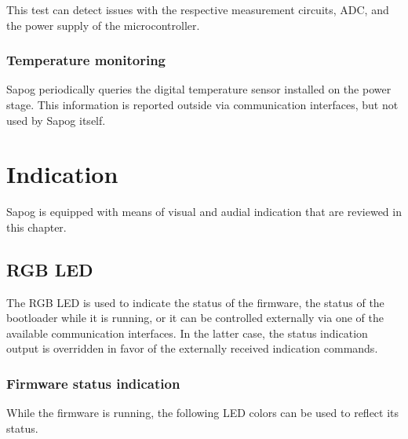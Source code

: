 \documentclass{zubaxdoc}
\begin{document}
This test can detect issues with the respective measurement circuits,
ADC, and the power supply of the microcontroller.

\subsection{Temperature monitoring}

Sapog periodically queries the digital temperature sensor installed on the power stage.
This information is reported outside via communication interfaces, but not used
by Sapog itself.

\chapter{Indication}\label{sec:indication}

Sapog is equipped with means of visual and audial indication that are reviewed in this chapter.

\section{RGB LED}

The RGB LED is used to indicate the status of the firmware,
the status of the bootloader while it is running,
or it can be controlled externally via one of the available communication interfaces.
In the latter case, the status indication output is overridden in favor of the externally
received indication commands.

\newcommand{\ShowSolidColor}[1]{%
{\color{#1}\rule{0.4em}{0.8em}\rule{0.4em}{0.8em}\rule{0.4em}{0.8em}\rule{0.4em}{0.8em}\rule{0.4em}{0.8em}}%
}
\newcommand{\ShowBlinkingColor}[1]{{%
\color{#1}\rule{0.4em}{0.8em}%
\color{black}\rule{0.4em}{0.8em}%
\color{#1}\rule{0.4em}{0.8em}%
\color{black}\rule{0.4em}{0.8em}%
\color{#1}\rule{0.4em}{0.8em}%
}}

\subsection{Firmware status indication}

While the firmware is running, the following LED colors can be used to reflect its status.
\end{document}
